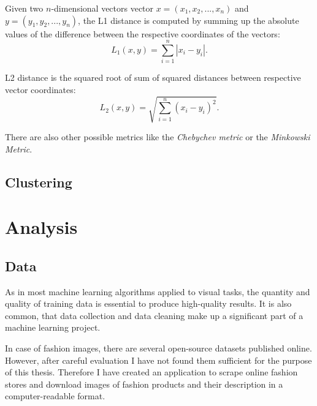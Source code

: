 \documentclass{article}
\begin{document}
Given two $n$-dimensional vectors vector $x = (x_1, x_2, ..., x_n)$ and $y = (y_1, y_2, ..., y_n)$, the L1 distance is computed by summing up the absolute values of the difference between the respective coordinates of the vectors:
\begin{equation}
L_1(x, y) = \sum_{i=1}^{n} |x_i - y_i|.
\end{equation} 

L2 distance is the squared root of sum of squared distances between respective vector coordinates:
\begin{equation}
L_2(x, y) = \sqrt{\sum_{i=1}^{n} (x_i - y_i)^2}.
\end{equation}

There are also other possible metrics like the \textit{Chebychev metric} or the \textit{Minkowski Metric}.


\pagebreak
\subsection{Clustering}



\pagebreak
\section{Analysis}

\subsection{Data} \label{sec:data}
As in most machine learning algorithms applied to visual tasks, the quantity and quality of training data is essential to produce high-quality results. It is also common, that data collection and data cleaning make up a significant part of a machine learning project.

In case of fashion images, there are several open-source datasets published online. However, after careful evaluation I have not found them sufficient for the purpose of this thesis. Therefore I have created an application to scrape online fashion stores and download images of fashion products and their description in a computer-readable format.
\end{document}

